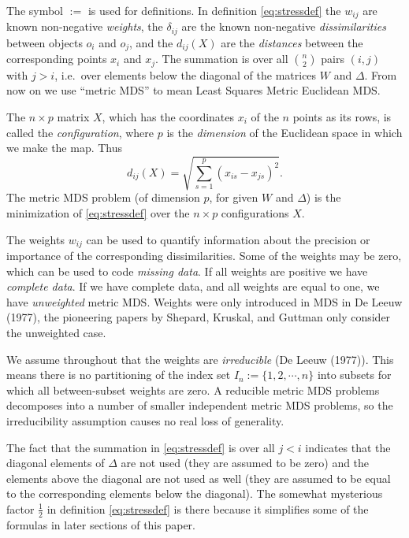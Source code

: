 \documentclass[
  12pt,
]{article}
\begin{document}
The symbol \(:=\) is used for definitions. In definition
\eqref{eq:stressdef} the \(w_{ij}\) are known non-negative \emph{weights}, the
\(\delta_{ij}\) are the known non-negative \emph{dissimilarities} between
objects \(o_i\) and \(o_j\), and the \(d_{ij}(X)\) are the \emph{distances} between
the corresponding points \(x_i\) and \(x_j\). The summation is over all
\(\binom{n}{2}\) pairs \((i,j)\) with \(j>i\), i.e.~over elements below the
diagonal of the matrices \(W\) and \(\Delta\). From now on we use ``metric
MDS'' to mean Least Squares Metric Euclidean MDS.

The \(n\times p\) matrix \(X\), which has the coordinates \(x_i\) of the \(n\)
points as its rows, is called the \emph{configuration}, where \(p\) is the
\emph{dimension} of the Euclidean space in which we make the map. Thus
\begin{equation}
d_{ij}(X)=\sqrt{\sum_{s=1}^p(x_{is}-x_{js})^2}.
\label{eq:ddef}
\end{equation} The metric MDS problem (of dimension \(p\), for given \(W\)
and \(\Delta\)) is the minimization of \eqref{eq:stressdef} over the
\(n\times p\) configurations \(X\).

The weights \(w_{ij}\) can be used to quantify information about the
precision or importance of the corresponding dissimilarities. Some of
the weights may be zero, which can be used to code \emph{missing data}. If
all weights are positive we have \emph{complete data}. If we have complete
data, and all weights are equal to one, we have \emph{unweighted} metric MDS.
Weights were only introduced in MDS in De Leeuw (1977), the pioneering
papers by Shepard, Kruskal, and Guttman only consider the unweighted
case.

We assume throughout that the weights are \emph{irreducible} (De Leeuw (1977)).
This means there is no partitioning of the index set
\(I_n:=\{1,2,\cdots,n\}\) into subsets for which all between-subset
weights are zero. A reducible metric MDS problems decomposes into a
number of smaller independent metric MDS problems, so the irreducibility
assumption causes no real loss of generality.

The fact that the summation in \eqref{eq:stressdef} is over all \(j<i\)
indicates that the diagonal elements of \(\Delta\) are not used (they are
assumed to be zero) and the elements above the diagonal are not used as
well (they are assumed to be equal to the corresponding elements below
the diagonal). The somewhat mysterious factor \(\frac12\) in definition
\eqref{eq:stressdef} is there because it simplifies some of the formulas
in later sections of this paper.
\end{document}
